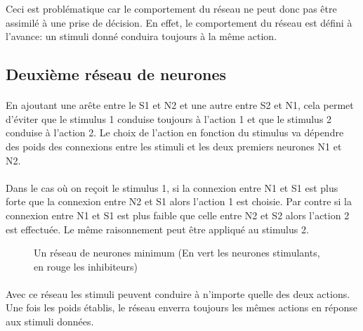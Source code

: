 Ceci est problématique car le comportement du réseau ne peut donc pas
être assimilé à une prise de décision. En effet, le comportement du réseau
est défini à l'avance: un stimuli donné conduira toujours à la même action.

\subsection{Deuxième réseau de neurones}
\paragraph{}
En ajoutant une arête entre le S1 et N2 et une autre entre S2 et N1, cela
permet d'éviter que le stimulus 1 conduise toujours à l'action 1 et que le
stimulus 2 conduise à l'action 2. Le choix de l'action en fonction du stimulus
va dépendre des poids des connexions entre les stimuli et les deux premiers
neurones N1 et N2.

\paragraph{}
Dans le cas où on reçoit le stimulus 1, si la connexion entre N1 et S1 est
plus forte que la connexion entre N2 et S1 alors l'action 1 est choisie.
Par contre si la connexion entre N1 et S1 est plus faible que celle entre
N2 et S2 alors l'action 2 est effectuée. Le même raisonnement peut être
appliqué au stimulus 2.

\begin{figure}[!h]
  \begin{center}
    
  \end{center}
  \caption{Un réseau de neurones minimum (En vert les neurones stimulants, en rouge les inhibiteurs)}
  \label{reseau2}
\end{figure}

\paragraph{}
Avec ce réseau les stimuli peuvent conduire à n'importe quelle des deux
actions. Une fois les poids établis, le réseau enverra toujours les mêmes
actions en réponse aux stimuli données.
